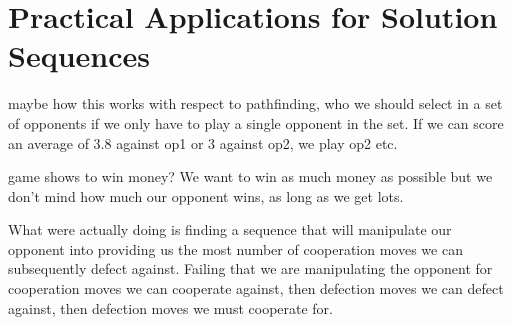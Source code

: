 \chapter{Practical Applications for Solution Sequences}\label{ch:applications}

maybe how this works with respect to pathfinding, who we should select in a set of opponents if we only have to play a single opponent in the set.
If we can score an average of 3.8 against op1 or 3 against op2, we play op2 etc.

game shows to win money?
We want to win as much money as possible but we don't mind how much our opponent wins, as long as we get lots.

What were actually doing is finding a sequence that will manipulate our opponent into providing us the most number of cooperation moves we can subsequently defect against.
Failing that we are manipulating the opponent for cooperation moves we can cooperate against, then defection moves we can defect against, then defection moves we must cooperate for.

